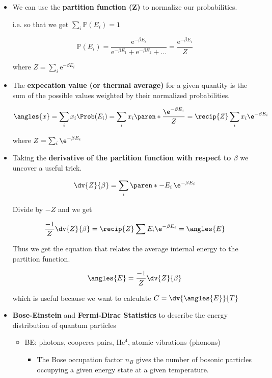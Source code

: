 \begin{itemize}
\begin{itemize}
        \item We can use the \textbf{partition function (Z)} to normalize our probabilities.

        i.e. so that we get $\sum_i \mathbb{P} (E_i) = 1$

        \[ \mathbb{P} (E_i) = \frac{\mathrm{e}^{-\beta E_i}}{\mathrm{e}^{-\beta E_1} + \mathrm{e}^{-\beta E_2} + \dots } = \frac{\mathrm{e}^{-\beta E_i}}{Z}\]

        where $Z = \sum_i \mathrm{e}^{-\beta E_i}$

        \item The \textbf{expecation value (or thermal average)} for a given quantity is the sum of the possible values weighted by their normalized probabilities.

        \[ \angles{x} = \sum_i x_i \Prob (E_i) = \sum_i x_i \paren*{\frac{\e^{-\beta E_i}}{Z}} = \recip{Z} \sum_i x_i \e^{-\beta E_i} \]

        where $ Z = \sum_i \e^{-\beta E_i} $

        \item Taking the \textbf{derivative of the partition function with respect to $\beta$} we uncover a useful trick.

        \[ \dv{Z}{\beta} = \sum_i \paren*{-E_i } \, \e^{-\beta E_i} \]

        Divide by $-Z$ and we get 

        \[ \frac{-1}{Z} \dv{Z}{\beta} = \recip{Z} \sum E_i \e^{-\beta E_i} = \angles{E}\]

        Thus we get the equation that relates the average internal energy to the partition function.

        \[ \angles{E} = \frac{-1}{Z} \dv{Z}{\beta}\]

        which is useful because we want to calculate $C = \dv{\angles{E}}{T}$

        \item \textbf{Bose-Einstein} and \textbf{Fermi-Dirac Statistics} to describe the energy distribution of quantum particles 

        \begin{itemize}
            \item BE: photons, cooperes pairs, He$^4$, atomic vibrations (phonons)
            \begin{itemize}
                \item The Bose occupation factor $n_B$ gives the number of bosonic particles occupying a given energy state at a given temperature.


\end{itemize}
\end{itemize}
\end{itemize}
\end{itemize}

